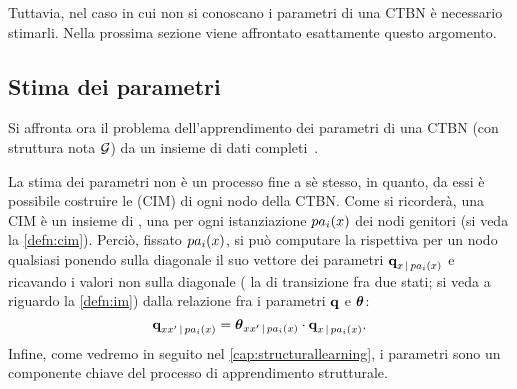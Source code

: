Tuttavia, nel caso in cui non si conoscano i parametri di una \acs{CTBN} è necessario stimarli. Nella prossima sezione viene affrontato esattamente questo argomento.

\subsection{Stima dei parametri}\label{sec:ctbn-params}
Si affronta ora il problema dell'apprendimento dei parametri di una \acl{CTBN} (con struttura nota $\mathcal{G}$) da un insieme di dati completi~\citep[si veda][sezione 5.1]{Nodelman2007}.

La stima dei parametri non è un processo fine a sè stesso, in quanto,  da essi è possibile costruire le \cim{} (\acs{CIM}) di ogni nodo della \acs{CTBN}. Come si ricorderà, una \acs{CIM} è un insieme di \im{}, una per ogni istanziazione $pa_i(\mathnormal{x})$ dei nodi genitori (si veda la \autoref{defn:cim}). Perciò, fissato $pa_i(\mathnormal{x})$, si può computare la rispettiva \im*{} per un nodo qualsiasi ponendo sulla diagonale il suo vettore dei parametri $\boldsymbol{\textbf{\text{q}}}_{x\,\arrowvert\,pa_i(\mathnormal{x})}$ e ricavando i valori non sulla diagonale (\ie{} la \emph{} di transizione fra due stati; si veda a riguardo la \autoref{defn:im}) dalla relazione fra i parametri $\boldsymbol{\textbf{\text{q}}}$ e $\boldsymbol{\textbf{\text{$\theta$}}}$:
\begin{equation}
\label{eq:ctbn-params-rel}
\boldsymbol{\textbf{\text{q}}}_{\mathnormal{x}\mathnormal{x}^\prime\,\arrowvert\,pa_i(\mathnormal{x})}=\boldsymbol{\textbf{\text{$\theta$}}}_{\mathnormal{x}\mathnormal{x}^\prime\,\arrowvert\,pa_i(\mathnormal{x})} \cdot \boldsymbol{\textbf{\text{q}}}_{\mathnormal{x}\,\arrowvert\,pa_i(\mathnormal{x})}\text{.}
\end{equation}
Infine, come vedremo in seguito nel \autoref{cap:structurallearning}, i parametri sono un componente chiave del processo di apprendimento strutturale.

